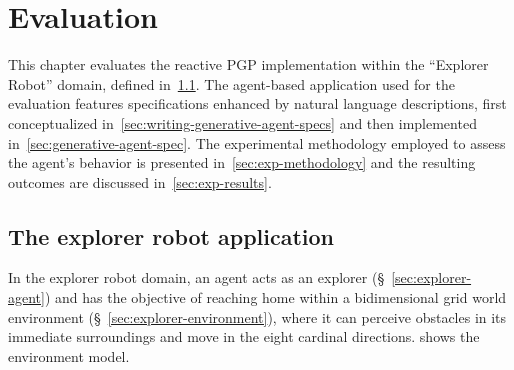 \documentclass[12pt,a4paper,openright,twoside]{book}
\begin{document}
\chapter{Evaluation}\label{chap:evaluation}

This chapter evaluates the reactive PGP implementation within the ``Explorer Robot'' domain, defined in~\cref{sec:exp-robot}.
%
The agent-based application used for the evaluation features specifications enhanced by natural language descriptions, first conceptualized in~\cref{sec:writing-generative-agent-specs} and then implemented in~\cref{sec:generative-agent-spec}.
%
The experimental methodology employed to assess the agent's behavior is presented in~\cref{sec:exp-methodology} and the resulting outcomes are discussed in~\cref{sec:exp-results}.

\section{The explorer robot application}\label{sec:exp-robot}

In the explorer robot domain, an agent acts as an explorer (\S~\ref{sec:explorer-agent}) and has the objective of reaching home within a bidimensional grid world environment (\S~\ref{sec:explorer-environment}), where it can perceive obstacles in its immediate surroundings and move in the eight cardinal directions.
%
 shows the environment model.
\end{document}
